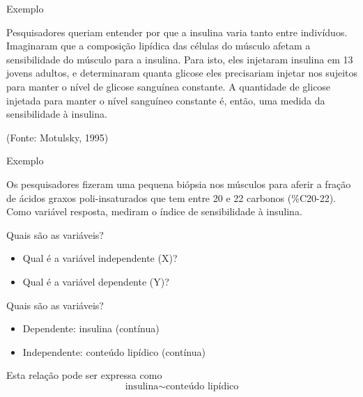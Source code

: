 \documentclass{beamer}
\begin{document}
\begin{frame}{Exemplo}
 \begin{example}
   Pesquisadores queriam entender por que a insulina varia tanto entre
   indivíduos. Imaginaram que a \alert<2>{composição lipídica} das células do
   músculo afetam a \alert<3>{sensibilidade do músculo para a insulina}. Para
   isto, eles injetaram insulina em 13 jovens adultos, e determinaram
   quanta glicose eles precisariam injetar nos sujeitos para manter o
   nível de glicose sanguínea constante. A quantidade de glicose
   injetada para manter o nível sanguíneo constante é, então, uma
   medida da sensibilidade à insulina.


    (Fonte: Motulsky, 1995)
  \end{example}
\end{frame}

\begin{frame}{Exemplo}
  \begin{example}
    Os pesquisadores fizeram uma pequena biópsia nos músculos para
    aferir a fração de ácidos graxos poli-insaturados que tem entre 20
    e 22 carbonos (\%C20-22). Como variável resposta, mediram o índice
    de sensibilidade à insulina.
  \end{example}
  \begin{block}{Quais são as variáveis?}
    \begin{itemize}
    \item Qual é a variável independente (X)? %
    \item Qual é a variável dependente (Y)? %
    \end{itemize}
  \end{block}
\end{frame}

\begin{frame}{Quais são as variáveis?}
  \begin{itemize}
  \item Dependente: insulina (contínua)
  \item Independente: conteúdo lipídico (contínua)
  \end{itemize}
  \vfill
  \begin{block}{Esta relação pode ser expressa como}
    \begin{displaymath}
      \text{insulina} \sim \text{conteúdo lipídico}
    \end{displaymath}
  \end{block}
\end{frame}
\end{document}
